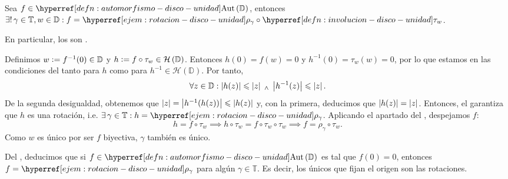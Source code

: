 \begin{teo}\label{teo:formula-aut-disco-unidad}
    Sea $\ds f \in \exhyperref[defn:automorfismo-disco-unidad]{automorfismo-disco-unidad}{\mathrm{Aut} \left(\mathbb{D}\right)}$, entonces $\exists !\, \gamma \in \mathbb{T}, w \in \mathbb{D} : f = \exhyperref[ejem:rotacion-disco-unidad]{ejem-rotacion-disco-unidad}{\rho_\gamma} \circ \exhyperref[defn:involucion-disco-unidad]{involucion-disco-unidad}{\tau_w}$.

    En particular, los  son .
\end{teo}
\begin{dem}
    Definimos $w \vcentcolon= f^{-1}(0) \in \mathbb{D}$ y $h \vcentcolon= f \circ \tau_w \in \mathcal{H}\left(\mathbb{D}\right)$. Entonces $h(0) = f(w) = 0$ y $h^{-1}(0) = \tau_w(w) = 0$, por lo que estamos en las condiciones del  tanto para $h$ como para $h^{-1} \in \mathcal{H}\left(\mathbb{D}\right)$.
    Por tanto,
    \[
    \forall z \in \mathbb{D} : \left|h(z)\right| \leqslant \left|z\right| \; _{\wedge} \; \left|h^{-1}(z)\right| \leqslant \left|z\right|.
    \]
    De la segunda desigualdad, obtenemos que $\left|z\right| = \left|h^{-1}(h(z))\right| \leqslant \left|h(z)\right|$ y, con la primera, deducimos que $\left|h(z)\right| = \left|z\right|$. Entonces, el  garantiza que $h$ es una rotación, i.e. $\exists\, \gamma \in \mathbb{T} : h = \exhyperref[ejem:rotacion-disco-unidad]{ejem-rotacion-disco-unidad}{\rho_\gamma}$. Aplicando el apartado  del , despejamos $f$:
    \[
    h = f \circ \tau_w \implies h \circ \tau_w = f \circ \tau_w \circ \tau_w \implies f = \rho_\gamma \circ \tau_w.
    \]
    Como $w$ es único por ser $f$ biyectiva, $\gamma$ también es único.\hfill\qedsymbol
\end{dem}

\begin{obs}\label{obs:aut-disco-unidad-fija-origen-imp-rotacion}
    Del , deducimos que si $f \in \exhyperref[defn:automorfismo-disco-unidad]{automorfismo-disco-unidad}{\mathrm{Aut} \left(\mathbb{D} \right)}$ es tal que $f(0) = 0$, entonces $f = \exhyperref[ejem:rotacion-disco-unidad]{ejem-rotacion-disco-unidad}{\rho_\gamma}$ para algún $\gamma \in \mathbb{T}$. Es decir, los únicos  que fijan el origen son las rotaciones.
\end{obs}

